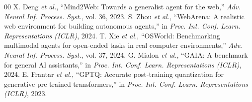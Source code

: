 \documentclass[conference]{IEEEtran}
\begin{document}
\begin{thebibliography}{00}
 X. Deng \emph{et al.}, ``Mind2Web: Towards a generalist agent for the web,'' \emph{Adv. Neural Inf. Process. Syst.}, vol. 36, 2023.
 S. Zhou \emph{et al.}, ``WebArena: A realistic web environment for building autonomous agents,'' in \emph{Proc. Int. Conf. Learn. Representations (ICLR)}, 2024.
 T. Xie \emph{et al.}, ``OSWorld: Benchmarking multimodal agents for open-ended tasks in real computer environments,'' \emph{Adv. Neural Inf. Process. Syst.}, vol. 37, 2024.
 G. Mialon \emph{et al.}, ``GAIA: A benchmark for general AI assistants,'' in \emph{Proc. Int. Conf. Learn. Representations (ICLR)}, 2024.
 E. Frantar \emph{et al.}, ``GPTQ: Accurate post-training quantization for generative pre-trained transformers,'' in \emph{Proc. Int. Conf. Learn. Representations (ICLR)}, 2023.
\end{thebibliography}
\end{document}
